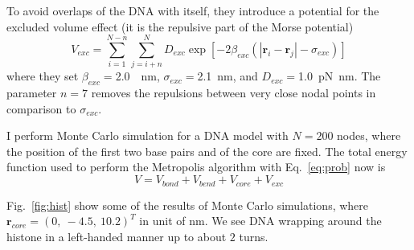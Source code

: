 \documentclass[a4paper,10pt]{article}
\begin{document}
To avoid overlaps of the DNA with itself, they introduce a potential for the excluded volume effect (it is the repulsive part of the Morse potential)
\begin{equation}\label{eq:exc}
V_{exc}=\sum_{i=1}^{N-n}\sum_{j=i+n}^{N}D_{exc}\exp\left[-2\beta_{exc}\left(\left|\textbf{r}_{i}-\textbf{r}_{j}\right|-\sigma_{exc}\right)\right]
\end{equation}
where they set $\beta_{exc}=$\SI{2.0}{\per\nm}, $\sigma_{exc}=$\SI{2.1}{\nm}, and $D_{exc}=$\SI{1.0}{\pico\newton\nano\meter}.
The parameter $n=7$ removes the repulsions between very close nodal points in comparison to $\sigma_{exc}$.

I perform Monte Carlo simulation for a DNA model with $N=200$ nodes, where the position of the first two base pairs and of the core are fixed.
The total energy function used to perform the Metropolis algorithm with Eq.~\ref{eq:prob} now is
\begin{equation}\label{eq:hist_energy}
V=V_{bond}+V_{bend}+V_{core}+V_{exc}
\end{equation}

Fig.~\ref{fig:hist} show some of the results of Monte Carlo simulations, where $\textbf{r}_{core}=\left(0,\ -4.5,\ 10.2\right)^T$ in unit of \si{\nm}.
We see DNA wrapping around the histone in a left-handed manner up to about $2$ turns.
\end{document}
